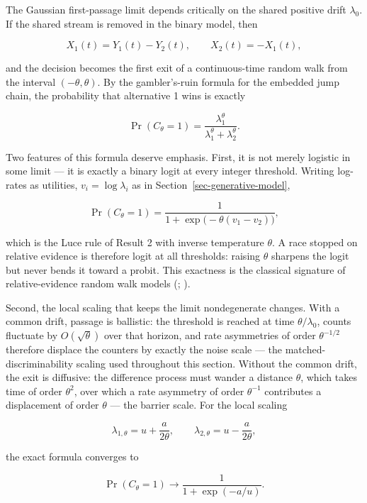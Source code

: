 \documentclass[
  man,
  floatsintext,
  longtable,
  a4paper,
  nolmodern,
  notxfonts,
  notimes,
  colorlinks=true,linkcolor=blue,citecolor=blue,urlcolor=blue]{apa7}
\begin{document}
The Gaussian first-passage limit depends critically on the shared
positive drift \(\lambda_0\). If the shared stream is removed in the
binary model, then

\[
X_1(t)=Y_1(t)-Y_2(t),
\qquad
X_2(t)=-X_1(t),
\]

and the decision becomes the first exit of a continuous-time random walk
from the interval \((-\theta,\theta)\). By the gambler's-ruin formula
for the embedded jump chain, the probability that alternative 1 wins is
exactly

\[
\Pr(C_\theta=1)
=
\frac{\lambda_1^\theta}
{\lambda_1^\theta+\lambda_2^\theta}.
\]

Two features of this formula deserve emphasis. First, it is not merely
logistic in some limit --- it is exactly a binary logit at every integer
threshold. Writing log-rates as utilities, \(v_i=\log\lambda_i\) as in
Section~\ref{sec-generative-model},

\[
\Pr(C_\theta=1)
=
\frac{1}{1+\exp\bigl(-\theta(v_1-v_2)\bigr)},
\]

which is the Luce rule of Result 2 with inverse temperature \(\theta\).
A race stopped on relative evidence is therefore logit at all
thresholds: raising \(\theta\) sharpens the logit but never bends it
toward a probit. This exactness is the classical signature of
relative-evidence random walk models
(; ).

Second, the local scaling that keeps the limit nondegenerate changes.
With a common drift, passage is ballistic: the threshold is reached at
time \(\theta/\lambda_0\), counts fluctuate by \(O(\sqrt{\theta})\) over
that horizon, and rate asymmetries of order \(\theta^{-1/2}\) therefore
displace the counters by exactly the noise scale --- the
matched-discriminability scaling used throughout this section. Without
the common drift, the exit is diffusive: the difference process must
wander a distance \(\theta\), which takes time of order \(\theta^{2}\),
over which a rate asymmetry of order \(\theta^{-1}\) contributes a
displacement of order \(\theta\) --- the barrier scale. For the local
scaling

\[
\lambda_{1,\theta}
=
u+\frac{a}{2\theta},
\qquad
\lambda_{2,\theta}
=
u-\frac{a}{2\theta},
\]

the exact formula converges to

\[
\Pr(C_\theta=1)
\longrightarrow
\frac{1}{1+\exp(-a/u)}.
\]
\end{document}
